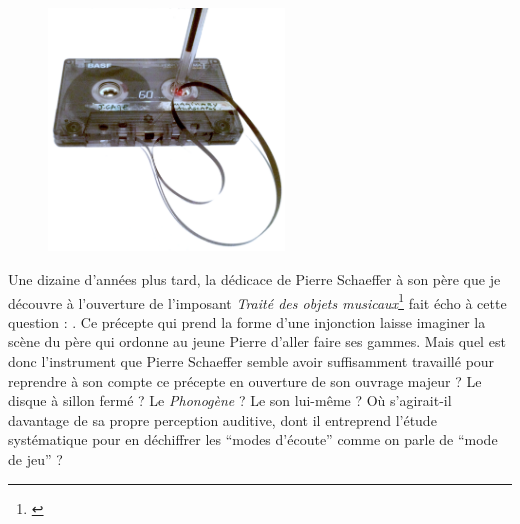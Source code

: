 \begin{figure}
	\vspace{-6.2em}
	\captionsetup{format=plain}
	\centering
 	\includegraphics[width=0.56\textwidth]{gfx/01_preamble/K7.png}
 	\label{fig:preamble:walkman}
\end{figure}
\par
\indent Une dizaine d'années plus tard, la dédicace de Pierre Schaeffer à son père que je découvre à l'ouverture de l'imposant \textit{Traité des objets musicaux}\footnote{\cite{schaeffer_traite_1966}} fait écho à cette question : . 
Ce précepte qui prend la forme d'une injonction laisse imaginer la scène du père qui ordonne au jeune Pierre d'aller faire ses gammes. Mais quel est donc l'instrument que Pierre Schaeffer semble avoir suffisamment travaillé pour reprendre à son compte ce précepte en ouverture de son ouvrage majeur ? Le disque à sillon fermé ? Le \textit{Phonogène} ? Le son lui-même ? Où s'agirait-il davantage de sa propre perception auditive, dont il entreprend l'étude systématique pour en déchiffrer les ``modes d'écoute'' comme on parle de ``mode de jeu'' ?\\

